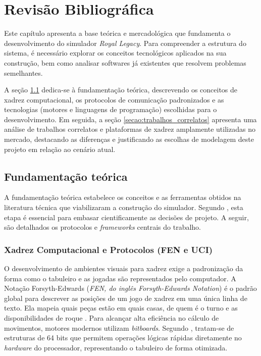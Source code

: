 \chapter{Revisão Bibliográfica}
\label{capitulo:revisao_bibliografica}

Este capítulo apresenta a base teórica e mercadológica que fundamenta o desenvolvimento do simulador \textit{Royal Legacy}. Para compreender a estrutura do sistema, é necessário explorar os conceitos tecnológicos aplicados na sua construção, bem como analisar softwares já existentes que resolvem problemas semelhantes.

A seção \ref{secao:fundamentacao_teorica} dedica-se à fundamentação teórica, descrevendo os conceitos de xadrez computacional, os protocolos de comunicação padronizados e as tecnologias (motores e linguagens de programação) escolhidas para o desenvolvimento. Em seguida, a seção \ref{secao:trabalhos_correlatos} apresenta uma análise de trabalhos correlatos e plataformas de xadrez amplamente utilizadas no mercado, destacando as diferenças e justificando as escolhas de modelagem deste projeto em relação ao cenário atual.

\section{Fundamentação teórica}
\label{secao:fundamentacao_teorica}

A fundamentação teórica estabelece os conceitos e as ferramentas obtidos na literatura técnica que viabilizaram a construção do simulador. Segundo , esta etapa é essencial para embasar cientificamente as decisões de projeto. A seguir, são detalhados os protocolos e \textit{frameworks} centrais do trabalho.

\subsection{Xadrez Computacional e Protocolos (FEN e UCI)}

O desenvolvimento de ambientes visuais para xadrez exige a padronização da forma como o tabuleiro e as jogadas são representados pelo computador. A Notação Forsyth-Edwards (\textit{FEN, do inglês Forsyth-Edwards Notation}) é o padrão global para descrever as posições de um jogo de xadrez em uma única linha de texto. Ela mapeia quais peças estão em quais casas, de quem é o turno e as disponibilidades de roque \cite{Hooper1992}. Para alcançar alta eficiência no cálculo de movimentos, motores modernos utilizam \textit{bitboards}. Segundo , tratam-se de estruturas de 64 bits que permitem operações lógicas rápidas diretamente no \textit{hardware} do processador, representando o tabuleiro de forma otimizada.


